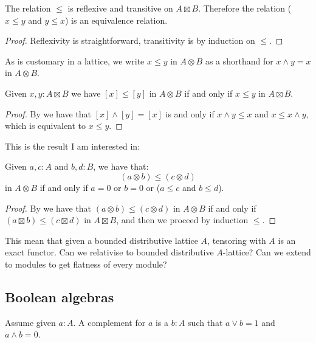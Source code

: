 \begin{lemma}\label{leq-transitive}
The relation $\leq$ is reflexive and transitive on $A\boxtimes B$. Therefore the relation ($x\leq y$ and $y\leq x$) is an equivalence relation.
\end{lemma}

\begin{proof}
Reflexivity is straightforward, transitivity is by induction on $\leq$.
\end{proof}

As is customary in a lattice, we write $x\leq y$ in $A\otimes B$ as a shorthand for $x\land y = x$ in $A\otimes B$.

\begin{lemma}\label{leq-otimes}
Given $x,y:A\boxtimes B$ we have $[x]\leq [y]$ in $A\otimes B$ if and only if $x\leq y$ in $A\boxtimes B$.
\end{lemma}

\begin{proof}
By  we have that $[x]\land [y]=[x]$ is and only if $x\land y\leq x$ and $x\leq x\land y$, which is equivalent to $x\leq y$.
\end{proof}

This is the result I am interested in:

\begin{proposition}
Given $a,c:A$ and $b,d:B$, we have that:
\[(a\otimes b) \leq (c\otimes d)\]
in $A\otimes B$ if and only if $a=0$ or $b=0$ or ($a\leq c$ and $b\leq d$).
\end{proposition}

\begin{proof}
By  we have that $(a\otimes b) \leq (c\otimes d)$ in $A\otimes B$ if and only if $(a\boxtimes b) \leq (c\boxtimes d)$ in $A\boxtimes B$, and then we proceed by induction $\leq$.
\end{proof}

\begin{remark}
This mean that given a bounded distributive lattice $A$, tensoring with $A$ is an exact functor. Can we relativise to bounded distributive $A$-lattice? Can we extend to modules to get flatness of every module?
\end{remark}

\subsection{Boolean algebras}

\begin{definition}
Assume given $a:A$. A complement for $a$ is a $b:A$ such that $a \lor b = 1$ and $a\land b = 0$.
\end{definition}

